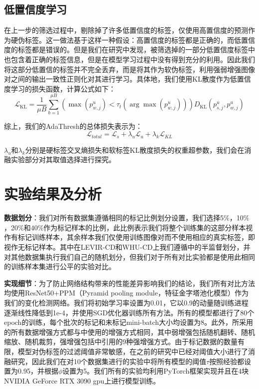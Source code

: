 \documentclass[lang=chs, degree=master, blindreview=false, adobe=false]{yanputhesis}
\begin{document}
\subsection{低置信度学习}
在上一步的筛选过程中，剔除掉了许多低置信度的标签，仅使用高置信度的预测作为硬伪标签。这一做法基于这样一种假设：高置信度的标签都是正确的，而低置信度的标签都是错误的。但是我们在研究中发现，被筛选掉的一部分低置信度标签中也包含着正确的标签信息，但是在模型学习过程中没有得到充分的利用。因此我们将这部分低置信的标签并不完全丢弃，而是将其作为软伪标签，利用强弱增强图像对之间的输出一致性正则化对其进行学习。具体地，我们使用KL散度作为低置信度学习的损失函数，计算公式如下：
\begin{equation}
  \label{eq:Adath_lossSoft}
  \mathcal{L}_{\mathrm{KL}}=\frac{1}{\mu B} \sum_{b=1}^{\mu B} \left(\max \left(p_{w, j}^{u}\right)<\tau_{t}\left(\arg \max \left(p_{w, j}^{u}\right)\right)\right) D_{\mathrm{KL}}\left(p_{s, j}^{u}, p_{w, j}^{u}\right)
\end{equation}

综上，我们的AdaThresh的总体损失表示为：
\begin{equation}
  \label{eq:Adath_lossSoft}
  \mathcal{L}_{total}=\mathcal{L}_{s}+\lambda_{u} \mathcal{L}_{u}+\lambda_{k} \mathcal{L}_{KL}
\end{equation}

$\lambda_{u}$和$\lambda_{k}$分别是硬标签交叉熵损失和软标签KL散度损失的权重超参数，我们会在消融实验部分对其取值选择进行探究。

\section{实验结果及分析}
\textbf{数据划分}：我们对所有数据集遵循相同的标记比例划分设置，我们选择5$\%$，10$\%$，20$\%$和40$\%$作为标记样本的比例，此比例表示我们将整个训练集的这部分样本视作有标记训练样本，其余样本我们仅使用训练图像对而不使用相应的真实标签，即视作无标记样本。其中在LEVIR-CD和WHU-CD上我们遵循\cite{bandara2022RCR}\cite{Zhang2023FPA}中的半监督划分，并对其他数据集执行我们自己的随机划分，但我们对于所有对比实验都是使用此相同的训练样本集进行公平的实验对比。

\textbf{实现细节}：为了防止网络结构带来的性能差异影响我们的结论，我们所有对比方法均使用ResNet50+PPM（Pyramid pooling module，特征金字塔池化模型）作为我们的变化检测网络。我们将初始学习率设置为0.01，它以0.9的动量随训练进程逐渐线性降低到1e-4，并使用SGD优化器训练所有方法。所有的模型都进行了80个epoch的训练，每个批次的标记和未标记mini-batch大小均设置为8。此外，所采用的所有数据增强方式都与\cite{Zhang2023FPA}中使用的增强方式相同，其中弱增强包括随机翻转、随机缩放、随机裁剪，强增强包括\cite{cubuk2020randaugment}中引用的9种强增强方式。由于标记数据的数量有限，模型对伪标签的过滤阈值非常敏感，在之前的研究中\cite{Zhang2023FPA}已经对阈值大小进行了消融研究，因此我们在对10个数据集进行的实验中将所有模型的阈值$\tau$按照经验都设置为0.95，并根据\cite{bandara2022RCR}$\phi$设置为5。我们所有的实验均利用PyTorch框架实现并且在4块NVIDIA GeForce RTX 3090 gpu上进行模型训练。
\end{document}
